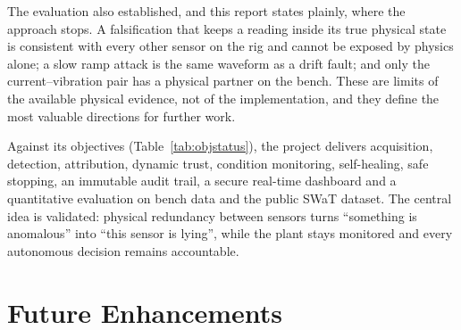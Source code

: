 The evaluation also established, and this report states plainly, where the approach stops. A falsification that keeps a reading inside its true physical state is consistent with every other sensor on the rig and cannot be exposed by physics alone; a slow ramp attack is the same waveform as a drift fault; and only the current--vibration pair has a physical partner on the bench. These are limits of the available physical evidence, not of the implementation, and they define the most valuable directions for further work.

Against its objectives (Table~\ref{tab:objstatus}), the project delivers acquisition, detection, attribution, dynamic trust, condition monitoring, self-healing, safe stopping, an immutable audit trail, a secure real-time dashboard and a quantitative evaluation on bench data and the public SWaT dataset. The central idea is validated: physical redundancy between sensors turns ``something is anomalous'' into ``this sensor is lying'', while the plant stays monitored and every autonomous decision remains accountable.

\section{Future Enhancements}

